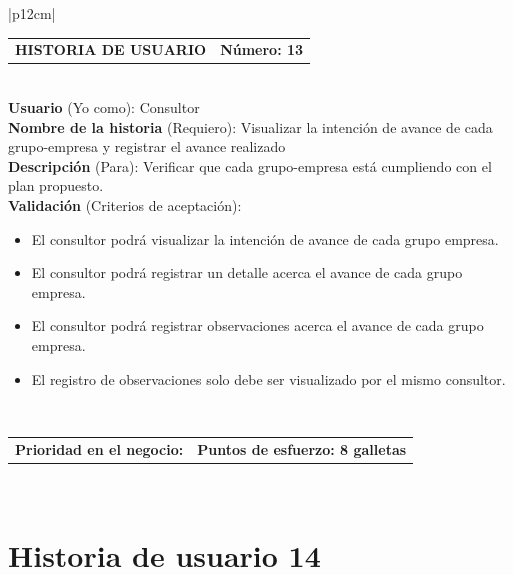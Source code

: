 \documentclass[11pt,letterpaper]{report}
\begin{document}
	\begin{center}	
		\begin{tabular}{|p{12cm}|}
			\hline
			\begin{tabular}{c|c}
				\textbf{HISTORIA DE USUARIO} & \textbf{Número: 13} \\
			\end{tabular} \\ \hline
			\textbf{Usuario} (Yo como): Consultor \\ \hline
			\textbf{Nombre de la historia} (Requiero): Visualizar la intención de avance de cada grupo-empresa y registrar el avance realizado \\ \hline
			\textbf{Descripción} (Para): Verificar que cada grupo-empresa está cumpliendo con el plan propuesto. \\ \hline
			\textbf{Validación} (Criterios de aceptación): \\
			\begin{minipage}{12cm}
				\begin{itemize}
					\item El consultor podrá visualizar la intención de avance de cada grupo empresa.
					\item El consultor podrá registrar un detalle acerca el avance de cada grupo empresa.
					\item El consultor podrá registrar observaciones acerca el avance de cada grupo empresa.
					\item El registro de observaciones solo debe ser visualizado por el mismo consultor.
				\end{itemize}
			\end{minipage} \\ \hline
			\begin{tabular}{p{6cm}|c}
				\textbf{Prioridad en el negocio: } & \textbf{Puntos de esfuerzo: 8 galletas} \\
			\end{tabular} \\ \hline
		\end{tabular}
	\end{center}
	
	\section{Historia de usuario 14}
	
\end{document}
